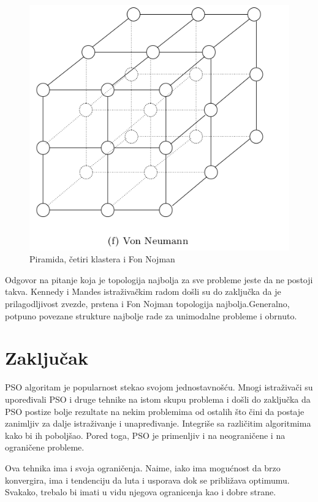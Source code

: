 \documentclass[a4paper]{article}
\begin{document}
\begin{figure}[htp]
    \includegraphics[scale=0.2]{VonNeumann.png}
    \caption{Piramida, četiri klastera i Fon Nojman}
    \label{fig:PiramidaCetiriKlasteraFonNojman}
\end{figure}
Odgovor na pitanje koja je topologija najbolja za sve probleme jeste da ne postoji takva.
Kennedy i Mandes istraživačkim radom došli su do zaključka da je prilagodljivost zvezde, prstena i Fon Nojman topologija najbolja.Generalno, potpuno povezane strukture najbolje rade za unimodalne probleme i obrnuto.


\section{Zaključak}

PSO algoritam je popularnost stekao svojom jednostavnošću. Mnogi istraživači su upoređivali PSO i druge tehnike na istom skupu problema i došli do zaključka da PSO postize bolje rezultate na nekim problemima od ostalih što čini da postaje zanimljiv za dalje istraživanje i unapređivanje. Integriše sa različitim algoritmima kako bi ih poboljšao. Pored toga, PSO je primenljiv i na neograničene i na ograničene probleme.

Ova tehnika ima i svoja ograničenja. Naime, iako ima mogućnost da brzo konvergira, ima i tendenciju da luta i usporava dok se približava optimumu. Svakako, trebalo bi imati u vidu njegova ogranicenja kao i dobre strane.


\appendix
 

\end{document}
